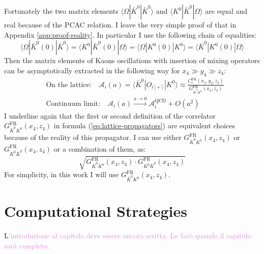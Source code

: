 \documentclass[english, LaM, oneside, noexaminfo]{sapthesis}
\newcommand{\la}{\langle}
\newcommand{\ra}{\rangle}
\newcommand{\colv}{\textcolor{violet}}
\begin{document}
Fortunately the two matrix elements $\la \Omega | \bar K^0 | \bar K^0 \ra$ and $\la K^0 | \bar K^0 | \Omega \ra$ are equal and real because of the PCAC relation.
I leave the very simple proof of that in Appendix \ref{app:proof-reality}.
In particular I use the following chain of equalities:
$$\la \Omega | \bar K^0 (0) | \bar K^0 \ra = \la K^0 | \bar K^0 (0) | \Omega \ra = \la \Omega | K^0 (0) | K^0 \ra = \la \bar K^0 | K^0 (0) | \Omega \ra $$
Then the matrix elements of Kaons oscillations with insertion of mixing operators can be asymptotically extracted in the following way for $x_4 \gg y_4 \gg z_4$:
\begin{equation}\label{eq:matrix-elements-extraction}
    \begin{split}
        & \text{On the lattice:} \quad \mathcal{A}_i (a) = \la \bar K^0 | O_{i[+]} | K^0 \ra \approx \frac{C_i^\text{FR} (x_4,y_4,z_4)}{G_{\bar K^0 K^0}^\text{FR}(x_4,z_4)} \\
        & \text{Continuum limit:} \quad \mathcal{A}_i (a) \xrightarrow{a \rightarrow 0} \mathcal{A}_i^\text{QCD} + O(a^2)
    \end{split}
\end{equation}
I underline again that the first or second definition of the correlator $G_{\bar K^0 K^0}^\text{FR}(x_4,z_4)$ in formula (\ref{eq:lattice-propagators}) are equivalent choices because of the reality of this propagator.
I can use either $G_{\bar K^0 K^0}^\text{FR}(x_4,z_4)$ or $G_{K^0 \bar K^0}^\text{FR}(x_4,z_4)$ or a combination of them, as:
\begin{equation*}
    \sqrt{G_{\bar K^0 K^0}^\text{FR}(x_4,z_4) \cdot G_{K^0 \bar K^0}^\text{FR}(x_4,z_4)}
\end{equation*}
For simplicity, in this work I will use $G_{\bar K^0 K^0}^\text{FR}(x_4,z_4)$.

\chapter{Computational Strategies}
\lettrine[lines=2, findent=3pt, nindent=0pt]{L}{}\colv{'introduzione al capitolo deve essere ancora scritta. Lo farò quando il capitolo sarà completo.}
\end{document}
